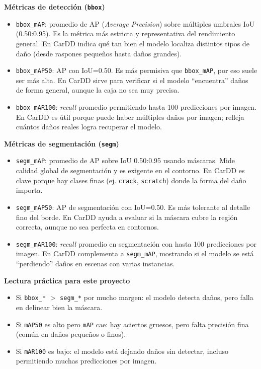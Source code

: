 \documentclass[12pt,a4paper]{article}
\begin{document}
\textbf{Métricas de detección (\texttt{bbox})}
\begin{itemize}
  \item \texttt{bbox\_mAP}: promedio de AP (\textit{Average Precision}) sobre múltiples
        umbrales IoU (0.50:0.95). Es la métrica más estricta y representativa del
        rendimiento general. En CarDD indica qué tan bien el modelo localiza distintos
        tipos de daño (desde raspones pequeños hasta daños grandes).
  \item \texttt{bbox\_mAP50}: AP con IoU=0.50. Es más permisiva que
        \texttt{bbox\_mAP}, por eso suele ser más alta. En CarDD sirve para verificar
        si el modelo ``encuentra'' daños de forma general, aunque la caja no sea
        muy precisa.
  \item \texttt{bbox\_mAR100}: \textit{recall} promedio permitiendo hasta 100
        predicciones por imagen. En CarDD es útil porque puede haber múltiples daños
        por imagen; refleja cuántos daños reales logra recuperar el modelo.
\end{itemize}

\textbf{Métricas de segmentación (\texttt{segm})}
\begin{itemize}
  \item \texttt{segm\_mAP}: promedio de AP sobre IoU 0.50:0.95 usando máscaras.
        Mide calidad global de segmentación y es exigente en el contorno. En CarDD es
        clave porque hay clases finas (ej. \texttt{crack}, \texttt{scratch}) donde la
        forma del daño importa.
  \item \texttt{segm\_mAP50}: AP de segmentación con IoU=0.50. Es más tolerante al
        detalle fino del borde. En CarDD ayuda a evaluar si la máscara cubre la región
        correcta, aunque no sea perfecta en contornos.
  \item \texttt{segm\_mAR100}: \textit{recall} promedio en segmentación con hasta 100
        predicciones por imagen. En CarDD complementa a \texttt{segm\_mAP}, mostrando
        si el modelo se está ``perdiendo'' daños en escenas con varias instancias.
\end{itemize}

\textbf{Lectura práctica para este proyecto}
\begin{itemize}
  \item Si \texttt{bbox\_*} $>$ \texttt{segm\_*} por mucho margen: el modelo detecta daños,
        pero falla en delinear bien la máscara.
  \item Si \texttt{mAP50} es alto pero \texttt{mAP} cae: hay aciertos gruesos, pero falta
        precisión fina (común en daños pequeños o finos).
  \item Si \texttt{mAR100} es bajo: el modelo está dejando daños sin detectar, incluso
        permitiendo muchas predicciones por imagen.
\end{itemize}
\end{document}
